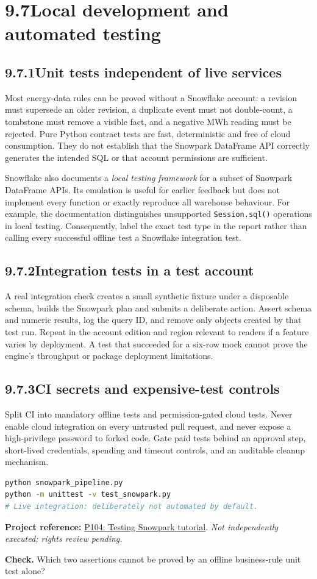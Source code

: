 \documentclass[11pt,twoside]{article}
\newcommand{\topic}[2]{\subsection*{#1\quad #2}}
\newcommand{\repo}[2]{\par\begingroup\fontsize{8.0}{9.6}\selectfont\sffamily\color{inkgray}\textbf{Project reference:} \href{#2}{#1}. \textit{Not independently executed; rights review pending.}\par\endgroup}
\begin{document}
\section*{9.7\quad Local development and automated testing}
\topic{9.7.1}{Unit tests independent of live services}
Most energy-data rules can be proved without a Snowflake account: a revision must supersede an older revision, a duplicate event must not double-count, a tombstone must remove a visible fact, and a negative MWh reading must be rejected. Pure Python contract tests are fast, deterministic and free of cloud consumption. They do not establish that the Snowpark DataFrame API correctly generates the intended SQL or that account permissions are sufficient.

Snowflake also documents a \emph{local testing framework} for a subset of Snowpark DataFrame APIs. Its emulation is useful for earlier feedback but does not implement every function or exactly reproduce all warehouse behaviour. For example, the documentation distinguishes unsupported \texttt{Session.sql()} operations in local testing. Consequently, label the exact test type in the report rather than calling every successful offline test a Snowflake integration test.
\topic{9.7.2}{Integration tests in a test account}
A real integration check creates a small synthetic fixture under a disposable schema, builds the Snowpark plan and submits a deliberate action. Assert schema and numeric results, log the query ID, and remove only objects created by that test run. Repeat in the account edition and region relevant to readers if a feature varies by deployment. A test that succeeded for a six-row mock cannot prove the engine's throughput or package deployment limitations.
\topic{9.7.3}{CI secrets and expensive-test controls}
Split CI into mandatory offline tests and permission-gated cloud tests. Never enable cloud integration on every untrusted pull request, and never expose a high-privilege password to forked code. Gate paid tests behind an approval step, short-lived credentials, spending and timeout controls, and an auditable cleanup mechanism.
\begin{lstlisting}[language=bash,caption={The reproducible default is an offline test.}]
python snowpark_pipeline.py
python -m unittest -v test_snowpark.py
# Live integration: deliberately not automated by default.
\end{lstlisting}
\repo{P104: Testing Snowpark tutorial}{https://github.com/Snowflake-Labs/sftutorial-snowpark-testing}
\textbf{Check.} Which two assertions cannot be proved by an offline business-rule unit test alone?
\newpage
\end{document}
